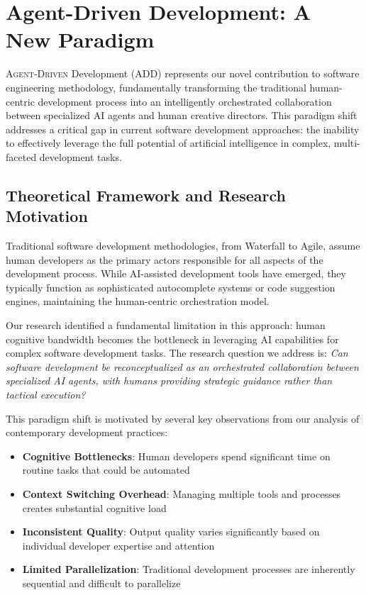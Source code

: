 
\section{Agent-Driven Development: A New Paradigm}
\label{sec:add-framework}

\lettrine{A}{gent-Driven} Development (ADD) represents our novel contribution to software engineering methodology, fundamentally transforming the traditional human-centric development process into an intelligently orchestrated collaboration between specialized AI agents and human creative directors. This paradigm shift addresses a critical gap in current software development approaches: the inability to effectively leverage the full potential of artificial intelligence in complex, multi-faceted development tasks.

\subsection{Theoretical Framework and Research Motivation}

Traditional software development methodologies, from Waterfall to Agile, assume human developers as the primary actors responsible for all aspects of the development process. While AI-assisted development tools have emerged, they typically function as sophisticated autocomplete systems or code suggestion engines, maintaining the human-centric orchestration model.

Our research identified a fundamental limitation in this approach: human cognitive bandwidth becomes the bottleneck in leveraging AI capabilities for complex software development tasks. The research question we address is: \textit{Can software development be reconceptualized as an orchestrated collaboration between specialized AI agents, with humans providing strategic guidance rather than tactical execution?}

This paradigm shift is motivated by several key observations from our analysis of contemporary development practices:

\begin{itemize}
    \item \textbf{Cognitive Bottlenecks}: Human developers spend significant time on routine tasks that could be automated
    \item \textbf{Context Switching Overhead}: Managing multiple tools and processes creates substantial cognitive load
    \item \textbf{Inconsistent Quality}: Output quality varies significantly based on individual developer expertise and attention
    \item \textbf{Limited Parallelization}: Traditional development processes are inherently sequential and difficult to parallelize
\end{itemize}

